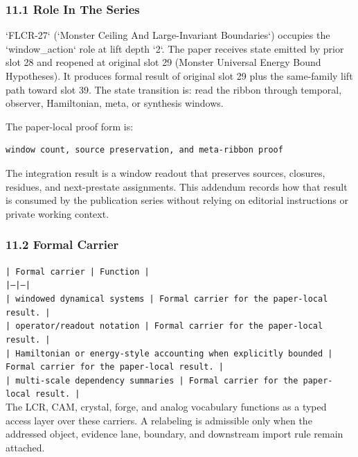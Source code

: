 \documentclass[11pt]{article}
\begin{document}
\subsubsection*{11.1 Role In The Series}

`FLCR-27` (`Monster Ceiling And Large-Invariant Boundaries`) occupies the `window\_action` role at lift depth `2`.
The paper receives state emitted by prior slot 28 and reopened at original slot 29 (Monster Universal Energy Bound Hypotheses). It produces formal result of original slot 29 plus the same-family lift path toward slot 39. The state transition is:
read the ribbon through temporal, observer, Hamiltonian, meta, or synthesis windows.

The paper-local proof form is:

\begin{verbatim}
window count, source preservation, and meta-ribbon proof
\end{verbatim}

The integration result is a window readout that preserves sources, closures, residues, and next-prestate assignments. This addendum records how that result is
consumed by the publication series without relying on editorial instructions or
private working context.

\subsubsection*{11.2 Formal Carrier}

\noindent\texttt{| Formal carrier | Function |}\\
\noindent\texttt{|---|---|}\\
\noindent\texttt{| windowed dynamical systems | Formal carrier for the paper-local result. |}\\
\noindent\texttt{| operator/readout notation | Formal carrier for the paper-local result. |}\\
\noindent\texttt{| Hamiltonian or energy-style accounting when explicitly bounded | Formal carrier for the paper-local result. |}\\
\noindent\texttt{| multi-scale dependency summaries | Formal carrier for the paper-local result. |}\\

The LCR, CAM, crystal, forge, and analog vocabulary functions as a typed access
layer over these carriers. A relabeling is admissible only when the addressed
object, evidence lane, boundary, and downstream import rule remain attached.
\end{document}
